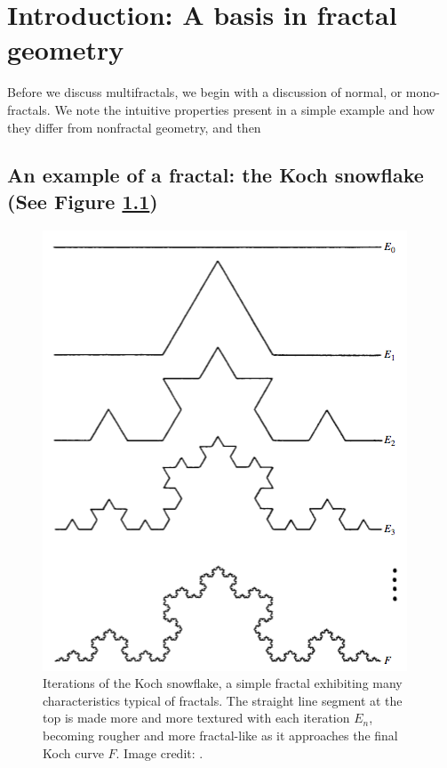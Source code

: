
\chapter{Introduction: A basis in fractal geometry} %

\label{Chapter1} %



Before we discuss multifractals, we begin with a discussion of normal, or mono-fractals. We note the intuitive properties present in a simple example and how they differ from nonfractal geometry, and then 

\section{An example of a fractal: the Koch snowflake (See Figure \ref{fig:kochcurve})}
\begin{figure}
\centering
\includegraphics[scale=0.5]{Chapters/Figures/Kochcurve.png} 
\caption[Koch Curve]{Iterations of the Koch snowflake, a simple fractal exhibiting many characteristics typical of fractals. The straight line segment at the top is made more and more textured with each iteration $E_{n}$, becoming rougher and more fractal-like as it approaches the final Koch curve $F$. Image credit: \citep{fractaltextbook}. }\label{fig:kochcurve}
\end{figure}

